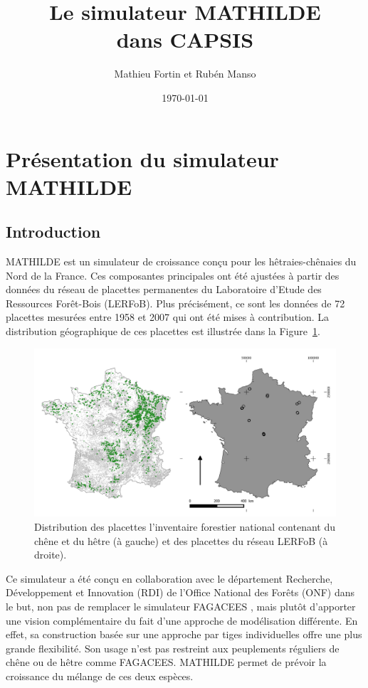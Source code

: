 \documentclass[a4paper,12pt]{article}
\title{Le simulateur MATHILDE \\ dans CAPSIS}
\author{Mathieu Fortin et Rubén Manso}
\date{\today}
\begin{document}
\maketitle
\tableofcontents

\listoffigures
\listoftables

\newpage

\section{Présentation du simulateur MATHILDE}

\subsection{Introduction}

MATHILDE est un simulateur de croissance conçu pour les hêtraies-chênaies du Nord de la France. Ces composantes principales ont été ajustées à partir des données du réseau de placettes permanentes du Laboratoire d'Etude des Ressources Forêt-Bois (LERFoB). Plus précisément, ce sont les données de 72 placettes mesurées entre 1958 et 2007 qui ont été mises à contribution. La distribution géographique de ces placettes est illustrée dans la Figure~\ref{figureDistributionPlacettes}.

\begin{figure}[h]
	\includegraphics[width=\textwidth]{./figures/distributionPlacettes}
	\caption{Distribution des placettes l'inventaire forestier national contenant du chêne et du hêtre (à gauche) et des placettes du réseau LERFoB (à droite).}
	\label{figureDistributionPlacettes}
\end{figure}

Ce simulateur a été conçu en collaboration avec le département Recherche, Développement et Innovation (RDI) de l'Office National des Forêts (ONF) dans le but, non pas de remplacer le simulateur FAGACEES \citep[cf.][]{dhote_beech_1996}, mais plutôt d'apporter une vision complémentaire du fait d'une approche de modélisation différente. En effet, sa construction basée sur une approche par tiges individuelles offre une plus grande flexibilité. Son usage n'est pas restreint aux peuplements réguliers de chêne ou de hêtre comme FAGACEES. MATHILDE permet de prévoir la croissance du mélange de ces deux espèces.
\end{document}
